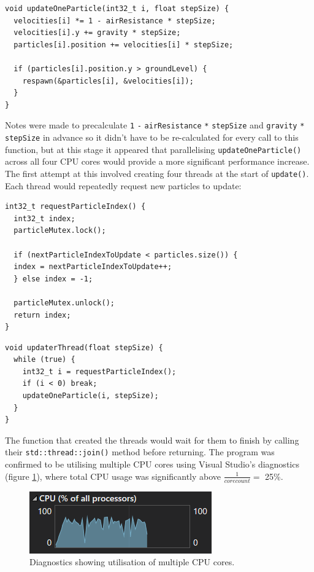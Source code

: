 \documentclass[11pt, a4paper, twocolumn]{article}
\begin{document}
\begin{verbatim}
void updateOneParticle(int32_t i, float stepSize) {
  velocities[i] *= 1 - airResistance * stepSize;
  velocities[i].y += gravity * stepSize;
  particles[i].position += velocities[i] * stepSize;

  if (particles[i].position.y > groundLevel) {
    respawn(&particles[i], &velocities[i]);
  }
}
\end{verbatim}

Notes were made to precalculate \verb|1| \verb|-| \verb|airResistance| \verb|*| \verb|stepSize| and \verb|gravity| \verb|*| \verb|stepSize| in advance so it didn't have to be re-calculated for every call to this function, but at this stage it appeared that parallelising \verb|updateOneParticle()| across all four CPU cores would provide a more significant performance increase. The first attempt at this involved creating four threads at the start of \verb|update()|. Each thread would repeatedly request new particles to update:

\begin{verbatim}
int32_t requestParticleIndex() {
  int32_t index;
  particleMutex.lock();
  
  if (nextParticleIndexToUpdate < particles.size()) {
  index = nextParticleIndexToUpdate++;
  } else index = -1;
  
  particleMutex.unlock();
  return index;
}
\end{verbatim}
\begin{verbatim}
void updaterThread(float stepSize) {
  while (true) {
    int32_t i = requestParticleIndex();
    if (i < 0) break;
    updateOneParticle(i, stepSize);
  }
}
\end{verbatim}

The function that created the threads would wait for them to finish by calling their \verb|std::thread::join()| method before returning. The program was confirmed to be utilising multiple CPU cores using Visual Studio's diagnostics (figure \ref{fig:multithread-diagnostics}), where total CPU usage was significantly above $\frac{1}{core count}=$ 25\%.

\begin{figure}[h]
\includegraphics[width=\linewidth]{multithread-diagnostics}
\caption{Diagnostics showing utilisation of multiple CPU cores.}
\label{fig:multithread-diagnostics}
\end{figure}
\end{document}
